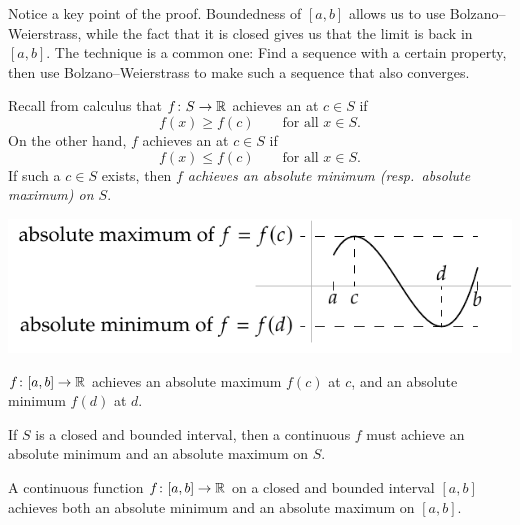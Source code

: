 Notice a key point of the proof.
Boundedness of $[a,b]$ allows us to use Bolzano--Weierstrass,
while the fact that it is closed gives us that the limit is back in $[a,b]$.
The technique is a common one: Find a sequence with a certain property,
then use Bolzano--Weierstrass to make such a sequence that also converges.

Recall from calculus that $f \colon S \to {\mathbb{R}}$ achieves an
\emph{} at $c \in S$ if
\begin{equation*}
f(x) \geq f(c) \qquad \text{for all } x \in S.
\end{equation*}
On the other hand, $f$ achieves an 
\emph{} at $c \in S$ if
\begin{equation*}
f(x) \leq f(c) \qquad \text{for all } x \in S.
\end{equation*}
If such a $c \in S$ exists, then 
$f$ \emph{achieves an absolute minimum (resp.\ absolute maximum) on
$S$}.
\begin{myfigureht}
\includegraphics{figures/minmax}
\caption{$f \colon [a,b] \to {\mathbb{R}}$ achieves an absolute maximum $f(c)$ at
$c$, and an absolute minimum $f(d)$ at $d$.\label{fig:minmax}}
\end{myfigureht}

If $S$ is a closed
and bounded interval, then a continuous $f$
must achieve an absolute minimum and an absolute
maximum on $S$.

\begin{thm}
%
%
%
A continuous function $f \colon [a,b] \to {\mathbb{R}}$ on a closed and bounded
interval $[a,b]$ 
achieves both an absolute minimum and an absolute maximum on $[a,b]$.
\end{thm}

